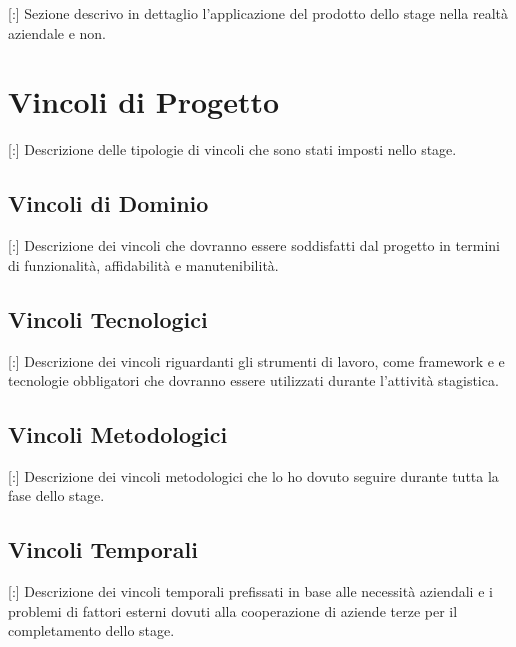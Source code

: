 [:] Sezione descrivo in dettaglio l'applicazione del prodotto dello stage nella realtà aziendale e non.

\section{Vincoli di Progetto}

[:] Descrizione delle tipologie di vincoli che sono stati imposti nello stage.

\subsection{Vincoli di Dominio}

[:] Descrizione dei vincoli che dovranno essere soddisfatti dal progetto in termini di funzionalità, affidabilità e manutenibilità. 

\subsection{Vincoli Tecnologici}

[:] Descrizione dei vincoli riguardanti gli strumenti di lavoro, come framework e  e tecnologie obbligatori che dovranno essere utilizzati durante l'attività stagistica.

\subsection{Vincoli Metodologici}

[:] Descrizione dei vincoli metodologici che lo ho dovuto seguire durante tutta la fase dello stage.

\subsection{Vincoli Temporali}

[:] Descrizione dei vincoli temporali prefissati in base alle necessità aziendali e i problemi di fattori esterni dovuti alla cooperazione di aziende terze per il completamento dello stage.
